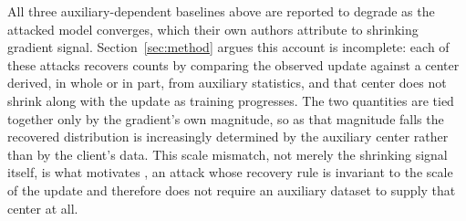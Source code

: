 All three auxiliary-dependent baselines above are reported to degrade as
the attacked model converges, which their own authors attribute to
shrinking gradient signal. Section~\ref{sec:method} argues this account is
incomplete: each of these attacks recovers counts by comparing the
observed update against a center derived, in whole or in part, from
auxiliary statistics, and that center does not shrink along with the
update as training progresses. The two quantities are tied together only
by the gradient's own magnitude, so as that magnitude falls the recovered
distribution is increasingly determined by the auxiliary center rather
than by the client's data. This scale mismatch, not merely the shrinking
signal itself, is what motivates \ourmethod{}, an attack whose recovery
rule is invariant to the scale of the update and therefore does not
require an auxiliary dataset to supply that center at all.

